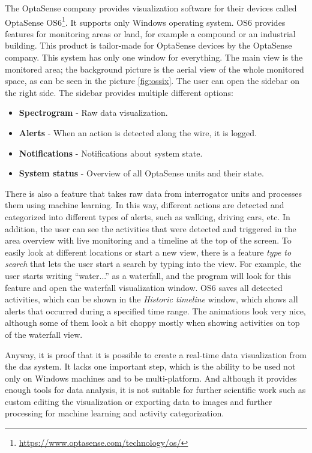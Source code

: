 The OptaSense company provides visualization software for their devices called OptaSense OS6\footnote{\url{https://www.optasense.com/technology/os/}}. It supports only Windows operating system. OS6 provides features for monitoring areas or land, for example a compound or an industrial building. This product is tailor-made for OptaSense devices by the OptaSense company. This system has only one window for everything. The main view is the monitored area; the background picture is the aerial view of the whole monitored space, as can be seen in the picture \ref{fig:ossix}. The user can open the sidebar on the right side. The sidebar provides multiple different options:

\begin{itemize}
    \item \textbf{Spectrogram} - Raw data visualization.
    \item \textbf{Alerts} - When an action is detected along the wire, it is logged.
    \item \textbf{Notifications} -  Notifications about system state.
    \item \textbf{System status} - Overview of all OptaSense units and their state.
\end{itemize}

There is also a feature that takes raw data from interrogator units and processes them using machine learning. In this way, different actions are detected and categorized into different types of alerts, such as walking, driving cars, etc. In addition, the user can see the activities that were detected and triggered in the area overview with live monitoring and a timeline at the top of the screen. To easily look at different locations or start a new view, there is a feature \textit{type to search} that lets the user start a search by typing into the view. For example, the user starts writing ``water...'' as a waterfall, and the program will look for this feature and open the waterfall visualization window. OS6 saves all detected activities, which can be shown in the \textit{Historic timeline} window, which shows all alerts that occurred during a specified time range. The animations look very nice, although some of them look a bit choppy mostly when showing activities on top of the waterfall view. 

Anyway, it is proof that it is possible to create a real-time data visualization from the \ac{das} system. It lacks one important step, which is the ability to be used not only on Windows machines and to be multi-platform. And although it provides enough tools for data analysis, it is not suitable for further scientific work such as custom editing the visualization or exporting data to images and further processing for machine learning and activity categorization.

